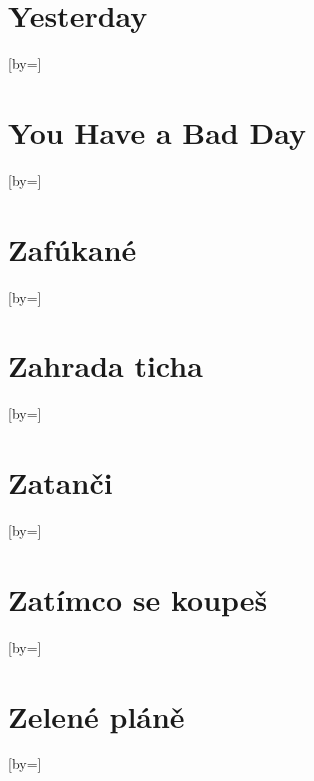 \documentclass{article}
\begin{document}
\begin{songs}{}
\section{Yesterday}
\begin{song}{}[by={}]
\beginverse

\endverse
\end{song}

\section{You Have a Bad Day}
\begin{song}{}[by={}]
\beginverse

\endverse
\end{song}

\section{Zafúkané}
\begin{song}{}[by={}]
\beginverse

\endverse
\end{song}

\section{Zahrada ticha}
\begin{song}{}[by={}]
\beginverse

\endverse
\end{song}

\section{Zatanči}
\begin{song}{}[by={}]
\beginverse

\endverse
\end{song}

\section{Zatímco se koupeš}
\begin{song}{}[by={}]
\beginverse

\endverse
\end{song}

\section{Zelené pláně}
\begin{song}{}[by={}]
\beginverse


\end{song}
\end{songs}
\end{document}
